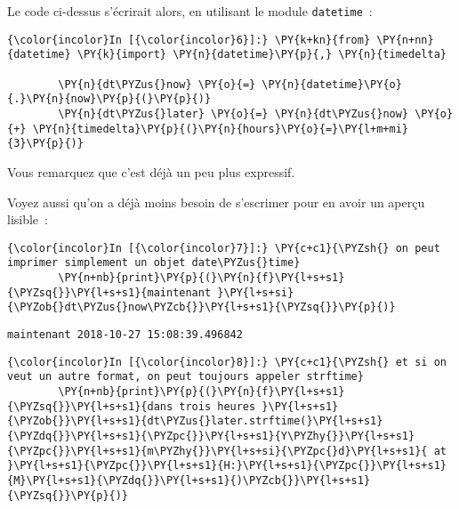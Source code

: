     Le code ci-dessus s'écrirait alors, en utilisant le module
\texttt{datetime}~:

    \begin{Verbatim}[commandchars=\\\{\},frame=single,framerule=0.3mm,rulecolor=\color{cellframecolor}]
{\color{incolor}In [{\color{incolor}6}]:} \PY{k+kn}{from} \PY{n+nn}{datetime} \PY{k}{import} \PY{n}{datetime}\PY{p}{,} \PY{n}{timedelta}
        
        \PY{n}{dt\PYZus{}now} \PY{o}{=} \PY{n}{datetime}\PY{o}{.}\PY{n}{now}\PY{p}{(}\PY{p}{)}
        \PY{n}{dt\PYZus{}later} \PY{o}{=} \PY{n}{dt\PYZus{}now} \PY{o}{+} \PY{n}{timedelta}\PY{p}{(}\PY{n}{hours}\PY{o}{=}\PY{l+m+mi}{3}\PY{p}{)}
\end{Verbatim}


    Vous remarquez que c'est déjà un peu plus expressif.

Voyez aussi qu'on a déjà moins besoin de s'escrimer pour en avoir un
aperçu lisible~:

    \begin{Verbatim}[commandchars=\\\{\},frame=single,framerule=0.3mm,rulecolor=\color{cellframecolor}]
{\color{incolor}In [{\color{incolor}7}]:} \PY{c+c1}{\PYZsh{} on peut imprimer simplement un objet date\PYZus{}time}
        \PY{n+nb}{print}\PY{p}{(}\PY{n}{f}\PY{l+s+s1}{\PYZsq{}}\PY{l+s+s1}{maintenant }\PY{l+s+si}{\PYZob{}dt\PYZus{}now\PYZcb{}}\PY{l+s+s1}{\PYZsq{}}\PY{p}{)}
\end{Verbatim}


    \begin{Verbatim}[commandchars=\\\{\},frame=single,framerule=0.3mm,rulecolor=\color{cellframecolor}]
maintenant 2018-10-27 15:08:39.496842
\end{Verbatim}

    \begin{Verbatim}[commandchars=\\\{\},frame=single,framerule=0.3mm,rulecolor=\color{cellframecolor}]
{\color{incolor}In [{\color{incolor}8}]:} \PY{c+c1}{\PYZsh{} et si on veut un autre format, on peut toujours appeler strftime}
        \PY{n+nb}{print}\PY{p}{(}\PY{n}{f}\PY{l+s+s1}{\PYZsq{}}\PY{l+s+s1}{dans trois heures }\PY{l+s+s1}{\PYZob{}}\PY{l+s+s1}{dt\PYZus{}later.strftime(}\PY{l+s+s1}{\PYZdq{}}\PY{l+s+s1}{\PYZpc{}}\PY{l+s+s1}{Y\PYZhy{}}\PY{l+s+s1}{\PYZpc{}}\PY{l+s+s1}{m\PYZhy{}}\PY{l+s+si}{\PYZpc{}d}\PY{l+s+s1}{ at }\PY{l+s+s1}{\PYZpc{}}\PY{l+s+s1}{H:}\PY{l+s+s1}{\PYZpc{}}\PY{l+s+s1}{M}\PY{l+s+s1}{\PYZdq{}}\PY{l+s+s1}{)\PYZcb{}}\PY{l+s+s1}{\PYZsq{}}\PY{p}{)}
\end{Verbatim}


